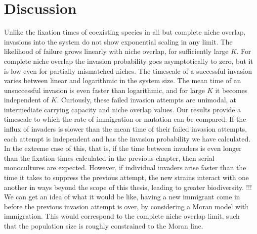 \section{Discussion}
Unlike the fixation times of coexisting species in all but complete niche overlap, invasions into the system do not show exponential scaling in any limit. 
The likelihood of failure grows linearly with niche overlap, for sufficiently large $K$. 
For complete niche overlap the invasion probability goes asymptotically to zero, but it is low even for partially mismatched niches. 
The timescale of a successful invasion varies between linear and logarithmic in the system size. 
The mean time of an unsuccessful invasion is even faster than logarithmic, and for large $K$ it becomes independent of $K$. 
Curiously, these failed invasion attempts are unimodal, at intermediate carrying capacity and niche overlap values. %
Our results provide a timescale to which the rate of immigration or mutation can be compared. 
If the influx of invaders is slower than the mean time of their failed invasion attempts, each attempt is independent and has the invasion probability we have calculated. 
In the extreme case of this, that is, if the time between invaders is even longer than the fixation times calculated in the previous chapter, then serial monocultures are expected.
However, if individual invaders arise faster than the time it takes to suppress the previous attempt, the new strains interact with one another in ways beyond the scope of this thesis, leading to greater biodiversity.
!!!%
We can get an idea of what it would be like, having a new immigrant come in before the previous invasion attempt is over, by considering a Moran model with immigration.
This would correspond to the complete niche overlap limit, such that the population size is roughly constrained to the Moran line.


